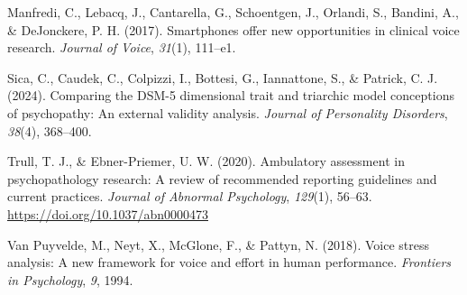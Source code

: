 \documentclass[
  english,
  man]{apa6}
\newlength{\cslhangindent}
\newenvironment{CSLReferences}[2] %
 {\begin{list}{}{%
  \setlength{\itemindent}{0pt}
  \setlength{\leftmargin}{0pt}
  \setlength{\parsep}{0pt}
  \ifodd #1
   \setlength{\leftmargin}{\cslhangindent}
   \setlength{\itemindent}{-1\cslhangindent}
  \fi
  \setlength{\itemsep}{#2\baselineskip}}}
 {\end{list}}
\begin{document}
\begin{CSLReferences}{1}{0}
Manfredi, C., Lebacq, J., Cantarella, G., Schoentgen, J., Orlandi, S., Bandini, A., \& DeJonckere, P. H. (2017). Smartphones offer new opportunities in clinical voice research. \emph{Journal of Voice}, \emph{31}(1), 111--e1.

Sica, C., Caudek, C., Colpizzi, I., Bottesi, G., Iannattone, S., \& Patrick, C. J. (2024). Comparing the DSM-5 dimensional trait and triarchic model conceptions of psychopathy: An external validity analysis. \emph{Journal of Personality Disorders}, \emph{38}(4), 368--400.

Trull, T. J., \& Ebner-Priemer, U. W. (2020). Ambulatory assessment in psychopathology research: A review of recommended reporting guidelines and current practices. \emph{Journal of Abnormal Psychology}, \emph{129}(1), 56--63. \url{https://doi.org/10.1037/abn0000473}

Van Puyvelde, M., Neyt, X., McGlone, F., \& Pattyn, N. (2018). Voice stress analysis: A new framework for voice and effort in human performance. \emph{Frontiers in Psychology}, \emph{9}, 1994.

\end{CSLReferences}
\end{document}
